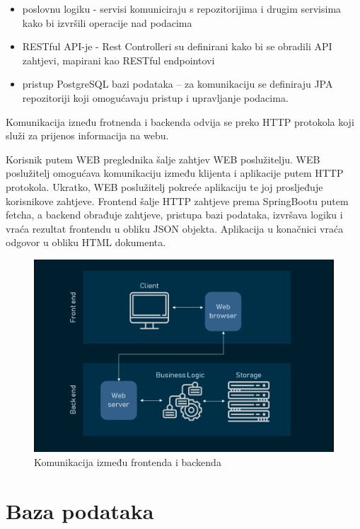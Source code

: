 	\begin{itemize}
		\item poslovnu logiku - servisi komuniciraju s repozitorijima i drugim servisima kako bi izvršili operacije nad podacima
		\item RESTful API-je - Rest Controlleri su definirani kako bi se obradili API zahtjevi, mapirani kao RESTful endpointovi
		\item pristup PostgreSQL bazi podataka – za komunikaciju se definiraju JPA repozitoriji koji omogućavaju pristup i upravljanje podacima.
	\end{itemize}
	
	\noindent Komunikacija izneđu frotnenda i backenda odvija se preko HTTP protokola koji služi za prijenos informacija na webu.
	
	Korisnik putem WEB preglednika šalje zahtjev WEB poslužitelju. WEB poslužitelj omogućava komunikaciju između klijenta i aplikacije putem HTTP protokola. Ukratko, WEB poslužitelj pokreće aplikaciju te joj prosljeđuje korisnikove zahtjeve. Frontend šalje HTTP zahtjeve prema SpringBootu putem fetcha, a backend obrađuje zahtjeve, pristupa bazi podataka, izvršava logiku i vraća rezultat frontendu u obliku JSON objekta.  Aplikacija u konačnici vraća odgovor u obliku HTML dokumenta.
	
		\begin{figure}[H]
		\includegraphics[scale=0.5]{slike/komunikacija.png} %
		\centering
		\caption{Komunikacija između frontenda i backenda}
		\label{fig:komunikacija} %
		\end{figure}
	
				
		\section{Baza podataka}
			
